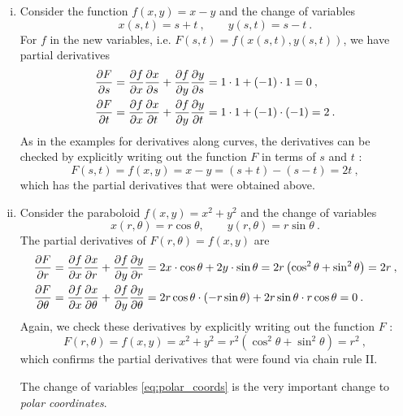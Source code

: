 \begin{example}
\label{expl:chain_rule_ii}
\begin{enumerate}[(i)]
	\item Consider the function $f(x,y)=x-y$ and the change of variables 
	\[x(s,t)=s+t \:, \qquad y(s,t)=s-t \:. \]
	For $f$ in the new variables, i.e. $F(s,t)=f(x(s,t),y(s,t))$, we have partial derivatives 
	\begin{equation*}
	\begin{split}
	\displaystyle{\frac{\partial F}{\partial s}} & = \displaystyle{\frac{\partial f}{\partial x}}\displaystyle{\frac{\partial x}{\partial s}} + \displaystyle{\frac{\partial f}{\partial y}}\displaystyle{\frac{\partial y}{\partial s}} = 1 \cdot 1 + (-1) \cdot 1 = 0 \:, \\
	\displaystyle{\frac{\partial F}{\partial t}} & = \displaystyle{\frac{\partial f}{\partial x}}\displaystyle{\frac{\partial x}{\partial t}} + \displaystyle{\frac{\partial f}{\partial y}}\displaystyle{\frac{\partial y}{\partial t}} = 1 \cdot 1 + (-1) \cdot (-1) = 2 \:.
	\end{split}
	\end{equation*}
	As in the examples for derivatives along curves, the derivatives can be checked by explicitly writing out the function $F$ in terms of $s$ and $t$ :
	\[ F(s,t) = f(x,y) = x-y = (s+t)-(s-t) = 2t \:, \]
	which has the partial derivatives that were obtained above.
	\item Consider the paraboloid $f(x,y)=x^2+y^2$ and the change of variables
	\begin{equation}
	\label{eq:polar_coords}
	x(r,\theta)=r\cos\theta, \qquad y(r,\theta)=r\sin\theta \:.
	\end{equation}
	The partial derivatives of $F(r,\theta)=f(x,y)$ are
	\begin{equation*}
	\begin{split}
	\displaystyle{\frac{\partial F}{\partial r}} & = \displaystyle{\frac{\partial f}{\partial x}}\displaystyle{\frac{\partial x}{\partial r}} + \displaystyle{\frac{\partial f}{\partial y}}\displaystyle{\frac{\partial y}{\partial r}} 
	= 2x \cdot \cos\theta + 2y \cdot \sin\theta 
	= 2r \left( \cos^2\theta + \sin^2\theta \right) = 2r \:, \\
	\displaystyle{\frac{\partial F}{\partial \theta}} & = \displaystyle{\frac{\partial f}{\partial x}}\displaystyle{\frac{\partial x}{\partial \theta}} + \displaystyle{\frac{\partial f}{\partial y}}\displaystyle{\frac{\partial y}{\partial \theta}} 
	= 2r\cos\theta \cdot (-r\sin\theta) + 2r\sin\theta \cdot r\cos\theta = 0 \:.
	\end{split}
	\end{equation*}
	Again, we check these derivatives by explicitly writing out the function $F$ :
	\[ F(r,\theta) = f(x,y) = x^2+y^2 = r^2 \left( \cos^2\theta + \sin^2\theta \right) = r^2 \:, \]
	which confirms the partial derivatives that were found via chain rule II.
	
	The change of variables \eqref{eq:polar_coords} is the very important change to \emph{polar coordinates}.
	

\end{enumerate}
\end{example}
